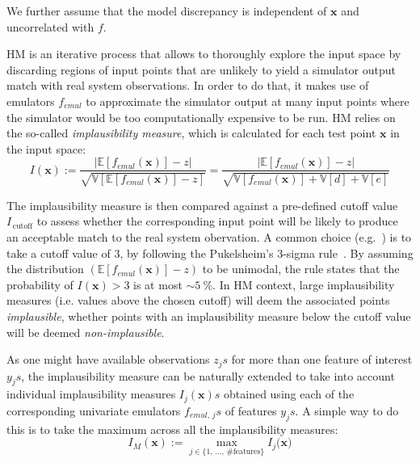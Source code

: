 \noindent
We further assume that the model discrepancy is independent of $\mathbf{x}$ and uncorrelated with $f$.

\vspace{0.2cm}
HM is an iterative process that allows to thoroughly explore the input space by discarding regions of input points that are unlikely to yield a simulator output match with real system observations. In order to do that, it makes use of emulators $f_{emul}$ to approximate the simulator output at many input points where the simulator would be too computationally expensive to be run. HM relies on the so-called \textit{implausibility measure}, which is calculated for each test point $\mathbf{x}$ in the input space:
%
\begin{equation}\label{eq:implmeasure}
    I(\mathbf{x}) := \frac{\lvert\mathbb{E}[f_{emul}(\mathbf{x})]-z\rvert}{\sqrt{\mathbb{V}[\mathbb{E}[f_{emul}(\mathbf{x})]-z]}} = \frac{\lvert\mathbb{E}[f_{emul}(\mathbf{x})]-z\rvert}{\sqrt{\mathbb{V}[f_{emul}(\mathbf{x})] + \mathbb{V}[d] + \mathbb{V}[e]}}
\end{equation}

\noindent
The implausibility measure is then compared against a pre-defined cutoff value $I_{\,\text{cutoff}}$ to assess whether the corresponding input point will be likely to produce an acceptable match to the real system obervation. A common choice (e.g.~\cite{Vernon:2010,Andrianakis:2015,Coveney:2018}) is to take a cutoff value of $3$, by following the Pukelsheim's $3$-sigma rule~\cite{Pukelsheim:1994}. By assuming the distribution $(\mathbb{E}[f_{emul}(\mathbf{x})]-z)$ to be unimodal, the rule states that the probability of $I(\mathbf{x})>3$ is at most $\sim\SI{5}{\percent}$. In HM context, large implausibility measures (i.e. values above the chosen cutoff) will deem the associated points \textit{implausible}, whether points with an implausibility measure below the cutoff value will be deemed \textit{non-implausible}. 

\vspace{0.2cm}
As one might have available observations $z_js$ for more than one feature of interest $y_js$, the implausibility measure can be naturally extended to take into account individual implausibility measures $I_j(\mathbf{x})s$ obtained using each of the corresponding univariate emulators $f_{emul,\,j}s$ of features $y_js$. A simple way to do this is to take the maximum across all the implausibility measures: 
%
\begin{equation}\label{eq:maximplmeasure}
    I_{M}(\mathbf{x}) := \max_{j\in\{1,\,\dots,\,\#\textrm{features}\}}{I_j(\mathbf{x}})
\end{equation}

